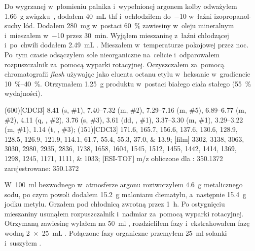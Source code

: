 Do wygrzanej w~płomieniu palnika i~wypełnionej argonem kolby odważyłem \SI{1.66}{\gram}
  związku~, dodałem \SI{40}{\mL} \gls{thf}
  i~ochłodziłem do~\SI{-10}{\degC} w~łaźni izopropanol-suchy lód.
Dodałem \SI{280}{\mg}  w~postaci \SI{60}{\percent} zawiesiny w~oleju mineralnym
  i~mieszałem w~\SI{-10}{\degC} przez \SI{30}{\minute}.
Wyjąłem mieszaninę z~łaźni chłodzącej i~po~chwili dodałem \SI{2.49}{\mL} .
Mieszałem w~temperaturze pokojowej przez noc.
Po~tym czasie odsączyłem sole nieorganiczne na~celicie i~odparowałem rozpuszczalnik za~pomocą
  wyparki rotacyjnej.
Oczyszczałem za~pomocą chromatografii \textit{flash} używając jako eluenta octanu etylu w~heksanie
  w~gradiencie \SIrange{10}{40}{\percent}.
Otrzymałem \SI{1.25}{\gram} produktu w~postaci białego ciała stałego (\SI{55}{\percent} wydajności).

\begin{fullexp}
  \NMR(600)[CDCl3] \num{8.41} (s, \#{1}), \numrange{7.40}{7.32} (m, \#{2}), \numrange{7.29}{7.16} (m, \#{5}), \numrange{6.89}{6.77} (m, \#{2}), \num{4.11} (q, , \#{2}), \num{3.76} (s, \#{3}), \num{3.61} (dd, , \#{1}), \numrange{3.37}{3.30} (m, \#{1}), \numrange{3.29}{3.22} (m, \#{1}), \num{1.14} (t, , \#{3});
  (151)[CDCl3] \numlist{171.6; 165.7; 156.6; 137.6; 130.6; 128.9; 128.5; 126.9; 121.9; 114.1; 61.7; 55.4; 55.3; 37.0; 13.9};
  [film] \numlist{3302; 3138; 3063; 3030; 2980; 2935; 2836; 1738; 1658; 1604; 1545; 1512; 1455; 1442; 1414; 1369; 1298; 1245; 1171; 1111; 1033};
  [ESI-TOF] m/z obliczone dla : \num{350.1372} zarejestrowane: \num{350.1372}
\end{fullexp}

W~\SI{100}{\ml} bezwodnego  w~atmosferze argonu roztworzyłem \SI{4.6}{\gram} metalicznego sodu,
  po czym powoli dodałem \SI{15.2}{\gram} malonianu diematylu, a~następnie \SI{15.4}{\gram} jodku metylu.
Grzałem pod chłodnicą zwrotną przez \SI{1}{\hour}.
Po ostygnięciu mieszaniny usunąłem rozpuszczalnik i~nadmiar  za~pomocą wyparki rotacyjnej.
Otrzymaną zawiesinę wylałem na \SI{50}{\ml} , rozdzieliłem fazy i~ekstrahowałem fazę wodną
  \SI[product-units = single]{2 x 25}{\mL} .
Połączone fazy organiczne przemyłem \SI{25}{\ml} solanki i~suszyłem .

